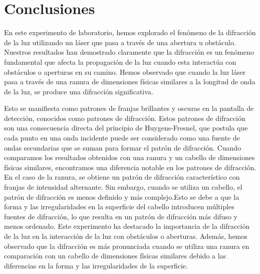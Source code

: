 \documentclass[twocolumn, 12pt]{article}
\begin{document}
\section{Conclusiones}

En este experimento de laboratorio, hemos explorado el
fenómeno de la difracción de la luz utilizando un láser que
pasa a través de una abertura u obstáculo. Nuestros
resultados han demostrado claramente que la difracción es
un fenómeno fundamental que afecta la propagación de la luz
cuando esta interactúa con obstáculos o aperturas en su
camino. Hemos observado que cuando la luz láser pasa a
través de una ranura de dimensiones físicas similares a la
longitud de onda de la luz, se produce una difracción
significativa.

Esto se manifiesta como patrones de franjas brillantes y
oscuras en la pantalla de detección, conocidos como
patrones de difracción. Estos patrones de difracción son
una consecuencia directa del principio de Huygens-Fresnel,
que postula que cada punto en una onda incidente puede ser
considerado como una fuente de ondas secundarias que se
suman para formar el patrón de difracción. Cuando
comparamos los resultados obtenidos con una ranura y un
cabello de dimensiones físicas similares, encontramos una
diferencia notable en los patrones de difracción. En el
caso de la ranura, se obtiene un patrón de difracción
característico con franjas de intensidad alternante. Sin
embargo, cuando se utiliza un cabello, el patrón de
difracción es menos definido y más complejo.Esto se debe a que la forma y las irregularidades en la
superficie del cabello introducen múltiples fuentes de
difracción, lo que resulta en un patrón de difracción más
difuso y menos ordenado. Este experimento ha destacado la
importancia de la difracción de la luz en la interacción de
la luz con obstáculos o aberturas. Además, hemos observado
que la difracción es más pronunciada cuando se utiliza una
ranura en comparación con un cabello de dimensiones físicas
similares debido a las diferencias en la forma y las
irregularidades de la superficie.

\printbibliography
\end{document}
